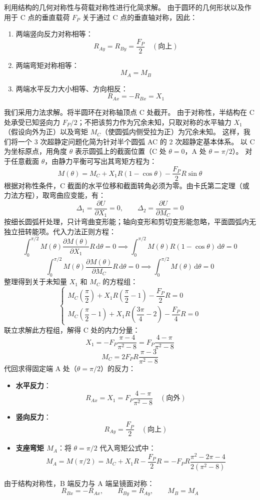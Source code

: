 \documentclass[11pt,a4paper]{ctexrep}
\newcommand{\diff}{\,\mathrm{d}}
\begin{document}
{利用结构的几何对称性与荷载对称性进行化简求解。
由于圆环的几何形状以及作用于 C 点的垂直载荷 $F_P$ 关于通过 C 点的垂直轴对称，因此：
\begin{enumerate}
    \item 两端竖向反力对称相等：
          \[
              R_{Ay} = R_{By} = \frac{F_P}{2} \quad (\text{向上})
          \]
    \item 两端弯矩对称相等：
          \[
              M_A = M_B
          \]
    \item 两端水平反力大小相等、方向相反：
          \[
              R_{Ax} = -R_{Bx} = X_1
          \]
\end{enumerate}
我们采用力法求解。将半圆环在对称轴顶点 C 处截开。
由于对称性，半结构在 C 处承受已知竖向力 $F_P/2$；不把该剪力作为冗余未知，只取对称的水平轴力 $X_1$（假设向外为正）以及弯矩 $M_C$（使圆弧内侧受拉为正）为冗余未知。
这样，我们将一个 3 次超静定问题化简为针对半个圆弧 AC 的 2 次超静定基本体系。
以 C 为坐标原点，用角度 $\theta$ 表示圆弧上的截面位置（C 处 $\theta = 0$，A 处 $\theta = \pi/2$）。
对于任意截面 $\theta$，由静力平衡可写出其弯矩方程为：
\[
    M(\theta) = M_C + X_1 R (1 - \cos\theta) - \frac{F_P}{2} R \sin\theta
\]
根据对称性条件，C 截面的水平位移和截面转角必须为零。由卡氏第二定理（或力法方程），取弯曲应变能，有：
\[
    \Delta_1 = \frac{\partial U}{\partial X_1} = 0, \qquad \Delta_2 = \frac{\partial U}{\partial M_C} = 0
\]
按细长圆弧杆处理，只计弯曲变形能；轴向变形和剪切变形能忽略，平面圆弧内无独立扭转能项。代入力法正则方程：
\[
    \int_{0}^{\pi/2} M(\theta) \frac{\partial M(\theta)}{\partial X_1} R \diff \theta = 0 \implies \int_{0}^{\pi/2} M(\theta) R(1-\cos\theta) \diff \theta = 0
\]
\[
    \int_{0}^{\pi/2} M(\theta) \frac{\partial M(\theta)}{\partial M_C} R \diff \theta = 0 \implies \int_{0}^{\pi/2} M(\theta) \diff \theta = 0
\]
整理得到关于未知量 $X_1$ 和 $M_C$ 的方程组：
\[
    \begin{cases}
        M_C \left(\dfrac{\pi}{2}\right) + X_1 R \left(\dfrac{\pi}{2} - 1\right) - \dfrac{F_P}{2} R = 0 \\
        M_C \left(\dfrac{\pi}{2} - 1\right) + X_1 R \left(\dfrac{3\pi}{4} - 2\right) - \dfrac{F_P}{4} R = 0
    \end{cases}
\]
联立求解此方程组，解得 C 处的内力分量：
\[
    X_1 = -F_P \frac{\pi - 4}{\pi^2 - 8} = F_P \frac{4 - \pi}{\pi^2 - 8}
\]
\[
    M_C = 2 F_P R \frac{\pi - 3}{\pi^2 - 8}
\]
代回求得固定端 A 处（$\theta = \pi/2$）的反力：
\begin{itemize}
    \item \textbf{水平反力}：
          \[
              R_{Ax} = X_1 = F_P \frac{4 - \pi}{\pi^2 - 8} \quad (\text{向外})
          \]
    \item \textbf{竖向反力}：
          \[
              R_{Ay} = \frac{F_P}{2} \quad (\text{向上})
          \]
    \item \textbf{支座弯矩 $M_A$}：将 $\theta = \pi/2$ 代入弯矩公式中：
          \[
              M_A = M(\pi/2) = M_C + X_1 R - \frac{F_P}{2} R = -F_P R \frac{\pi^2 - 2\pi - 4}{2(\pi^2 - 8)}
          \]
\end{itemize}
由于结构对称性，B 端反力与 A 端呈镜面对称：
\[
    R_{Bx} = - R_{Ax}, \qquad R_{By} = R_{Ay}, \qquad M_B = M_A
\]

}
\end{document}
